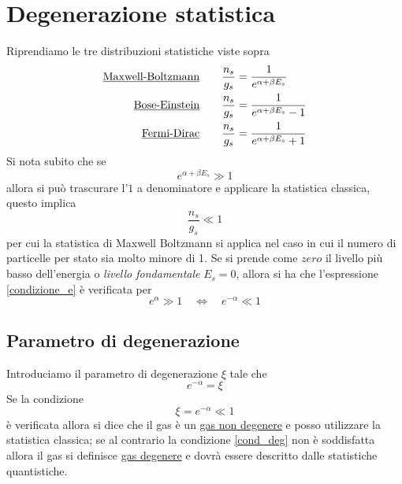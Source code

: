
\section{Degenerazione statistica}
Riprendiamo le tre distribuzioni statistiche viste sopra
\begin{equation}
\begin{split}
\mbox{\underline{Maxwell-Boltzmann}}  \quad\quad  \frac{n_s}{g_s} & = \frac{1}{e^{\alpha + \beta E_s}} \\
\mbox{\underline{Bose-Einstein}}  \quad\quad  \frac{n_s}{g_s} & = \frac{1}{e^{\alpha + \beta E_s} - 1} \\
\mbox{\underline{Fermi-Dirac}}  \quad\quad  \frac{n_s}{g_s} & = \frac{1}{e^{\alpha + \beta E_s} + 1 } 
\end{split}
\end{equation}
Si nota subito che se 
\begin{equation}
e^{\alpha + \beta E_s} \gg 1
\label{condizione_e}
\end{equation}
allora si può trascurare l'$1$ a denominatore e applicare la statistica classica, questo implica
\begin{equation}
\frac{n_s}{g_s} \ll 1
\end{equation}
per cui la statistica di Maxwell Boltzmann si applica nel caso in cui il numero di particelle per stato sia molto minore di 1.
Se si prende come $zero$ il livello più basso dell'energia o \textit{livello fondamentale} $E_s = 0$, allora si ha che l'espressione \ref{condizione_e} è verificata per
\begin{equation}
e^{\alpha} \gg 1 \quad\Leftrightarrow\quad  e^{-\alpha} \ll 1
\end{equation}

\subsection{Parametro di degenerazione} Introduciamo il parametro di degenerazione $\xi$ tale che 
\begin{equation}
e^{-\alpha} = \xi 
\end{equation}
Se la condizione 
\begin{equation}
\xi = e^{-\alpha} \ll 1
\label{cond_deg}
\end{equation}
è verificata allora si dice che il gas è un \underline{gas non degenere} e posso utilizzare la statistica classica;
se al contrario la condizione \ref{cond_deg} non è soddisfatta allora il gas si definisce \underline{gas degenere} e dovrà essere descritto dalle statistiche quantistiche.

